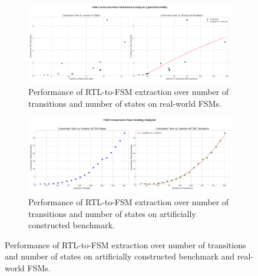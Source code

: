 \documentclass[acmsmall,screen,review]{acmart}
\begin{document}
\begin{figure}[ht]
    \begin{subfigure}[t]{0.49\textwidth}

  \includegraphics[width=\columnwidth]{fsm_conversion_performance_plot.png}

\caption{Performance of RTL-to-FSM extraction over number of transitions and number of states on real-world FSMs.}
    \end{subfigure}
    \hfill
    \begin{subfigure}[t]{0.49\textwidth}
  \includegraphics[width=\columnwidth]{fsm_conversion_scaling_plot.png}

\caption{Performance of RTL-to-FSM extraction over number of transitions and number of states on artificially constructed benchmark.}
    \end{subfigure}

\caption{Performance of RTL-to-FSM extraction over number of transitions and number of states on artificially constructed benchmark and real-world FSMs.}
\label{fig:fsm-performance}
\end{figure}
\end{document}
